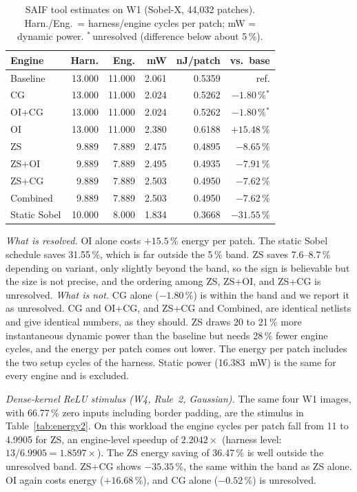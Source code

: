 \documentclass[11pt,journal,draftclsnofoot,onecolumn]{IEEEtran}
\begin{document}
\begin{table}[t]
\centering
\caption{SAIF tool estimates on W1 (Sobel-X, 44{,}032 patches). Harn./Eng.\ = harness/engine cycles per patch; mW = dynamic power. $^{\ast}$\,unresolved (difference below about 5\,\%).}
\label{tab:energy}
\small
\setlength{\tabcolsep}{8pt}
\begin{tabular}{lrrrrr}
\toprule
\textbf{Engine} & \textbf{Harn.} & \textbf{Eng.} & \textbf{mW} & \textbf{nJ/patch} & \textbf{vs.\ base}\\
\midrule
Baseline     & 13.000 & 11.000 & 2.061 & 0.5359 & ref.\\
CG           & 13.000 & 11.000 & 2.024 & 0.5262 & $-1.80\,\%$$^{\ast}$\\
OI+CG        & 13.000 & 11.000 & 2.024 & 0.5262 & $-1.80\,\%$$^{\ast}$\\
OI           & 13.000 & 11.000 & 2.380 & 0.6188 & $+15.48\,\%$\\
ZS           &  9.889 &  7.889 & 2.475 & 0.4895 & $-8.65\,\%$\\
ZS+OI        &  9.889 &  7.889 & 2.495 & 0.4935 & $-7.91\,\%$\\
ZS+CG        &  9.889 &  7.889 & 2.503 & 0.4950 & $-7.62\,\%$\\
Combined     &  9.889 &  7.889 & 2.503 & 0.4950 & $-7.62\,\%$\\
Static Sobel & 10.000 &  8.000 & 1.834 & 0.3668 & $-31.55\,\%$\\
\bottomrule
\end{tabular}
\end{table}

\emph{What is resolved.} OI alone costs $+15.5$\,\% energy per patch. The static Sobel
schedule saves 31.55\,\%, which is far outside the 5\,\% band. ZS saves 7.6--8.7\,\%
depending on variant, only slightly beyond the band, so the sign is believable but the
size is not precise, and the ordering among ZS, ZS+OI, and ZS+CG is unresolved.
\emph{What is not.} CG alone ($-1.80$\,\%) is within the band and we report it as
unresolved. CG and OI+CG, and ZS+CG and Combined, are identical netlists and give
identical numbers, as they should. ZS draws 20 to 21\,\% more instantaneous dynamic power
than the baseline but needs 28\,\% fewer engine cycles, and the energy per patch comes
out lower. The energy per patch includes the two setup cycles of the harness. Static power
(16.383~mW) is the same for every engine and is excluded.

\emph{Dense-kernel ReLU stimulus (W4, Rule~2, Gaussian).} The same four W1 images, with
66.77\,\% zero inputs including border padding, are the stimulus in
Table~\ref{tab:energy2}. On this workload the engine cycles per patch fall from 11 to
4.9905 for ZS, an engine-level speedup of $2.2042\times$ (harness level: $13/6.9905=1.8597\times$). The ZS energy saving of 36.47\,\% is well outside the unresolved band.
ZS+CG shows $-35.35$\,\%, the same within the band as ZS alone. OI again costs
energy ($+16.68$\,\%), and CG alone ($-0.52$\,\%) is unresolved.
\end{document}

